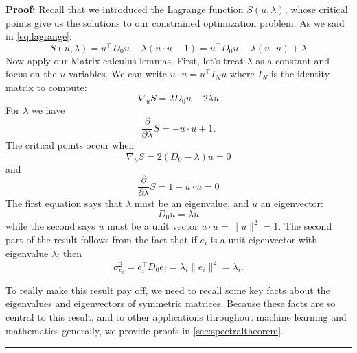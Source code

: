 \documentclass[
  oneside]{scrbook}
\newcommand{\df}[1]{\frac{\partial}{\partial #1}}
\begin{document}
\textbf{Proof:} Recall that we introduced the Lagrange function
\(S(u,\lambda)\), whose critical points give us the solutions to our
constrained optimization problem. As we said in \cref{eq:lagrange}: \[
S(u,\lambda) = u^{\intercal}D_{0}u - \lambda(u\cdot u - 1) = u^{\intercal}D_{0}u -\lambda(u\cdot u) + \lambda
\] Now apply our Matrix calculus lemmas. First, let's treat \(\lambda\)
as a constant and focus on the \(u\) variables. We can write
\(u\cdot u = u^{\intercal} I_{N} u\) where \(I_{N}\) is the identity
matrix to compute: \[
\nabla_{u} S = 2D_{0}u -2\lambda u
\] For \(\lambda\) we have \[
\df{\lambda}S = -u\cdot u +1.
\] The critical points occur when \[
\nabla_{u} S = 2(D_{0}-\lambda)u = 0
\] and \[
\df{\lambda}S = 1-u\cdot u = 0
\] The first equation says that \(\lambda\) must be an eigenvalue, and
\(u\) an eigenvector: \[
D_{0}u = \lambda u
\] while the second says \(u\) must be a unit vector
\(u\cdot u=\|u\|^2=1\). The second part of the result follows from the
fact that if \(e_{i}\) is a unit eigenvector with eigenvalue
\(\lambda_{i}\) then \[
\sigma_{e_{i}}^2 = e_{i}^{\intercal}D_{0}e_{i} = \lambda_{i}\|e_{i}\|^2=\lambda_{i}.
\]

To really make this result pay off, we need to recall some key facts
about the eigenvalues and eigenvectors of symmetric matrices. Because
these facts are so central to this result, and to other applications
throughout machine learning and mathematics generally, we provide proofs
in \cref{sec:spectraltheorem}.

\begin{center}\rule{0.5\linewidth}{0.5pt}\end{center}
\end{document}

